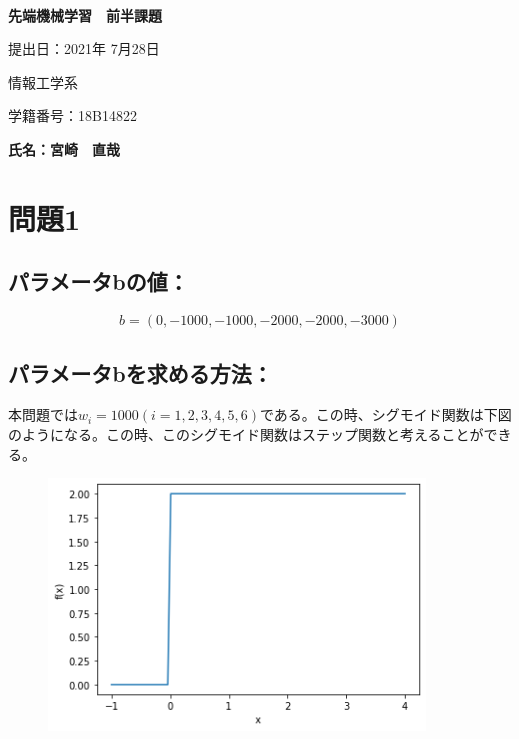 \documentclass[a4j,11pt]{jarticle}
\begin{document}
\begin{center}
　\vspace{10mm}

{\bf {\huge 先端機械学習　前半課題}}

\vspace{80mm}

提出日：2021年 7月28日

\vspace{10mm}

情報工学系

\vspace{10mm}

学籍番号：18B14822

\vspace{10mm}


\vspace{20mm}

{\bf {\LARGE 氏名：宮崎　直哉}}
\end{center}





\newpage




\section{問題1}

\subsection*{パラメータbの値：}

\begin{equation*}
    b = (0, -1000, -1000, -2000, -2000, -3000)
\end{equation*}

\subsection*{パラメータbを求める方法：}
本問題では$w_i = 1000 (i = 1,2,3,4,5,6)$である。この時、シグモイド関数は下図のようになる。この時、このシグモイド関数はステップ関数と考えることができる。

\begin{figure}[hbtp]
    \centering
    \includegraphics[width=10cm]{p1-3.png}
\end{figure}
\end{document}
